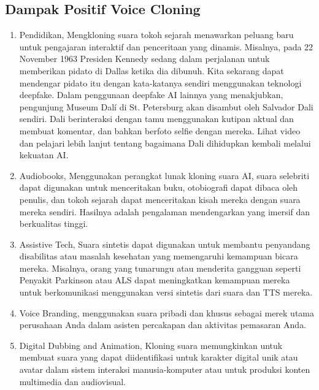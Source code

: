 \subsection{Dampak Positif Voice Cloning}
\begin{enumerate}
\item Pendidikan, Mengkloning suara tokoh sejarah menawarkan peluang baru untuk pengajaran interaktif dan penceritaan yang dinamis. Misalnya, pada 22 November 1963 Presiden Kennedy sedang dalam perjalanan untuk memberikan pidato di Dallas ketika dia dibunuh. Kita sekarang dapat mendengar pidato itu dengan kata-katanya sendiri menggunakan teknologi deepfake. Dalam penggunaan deepfake AI lainnya yang menakjubkan, pengunjung Museum Dalí di St. Petersburg akan disambut oleh Salvador Dali sendiri. Dali berinteraksi dengan tamu menggunakan kutipan aktual dan membuat komentar, dan bahkan berfoto selfie dengan mereka. Lihat video dan pelajari lebih lanjut tentang bagaimana Dali dihidupkan kembali melalui kekuatan AI. 

\item Audiobooks, Menggunakan perangkat lunak kloning suara AI, suara selebriti dapat digunakan untuk menceritakan buku, otobiografi dapat dibaca oleh penulis, dan tokoh sejarah dapat menceritakan kisah mereka dengan suara mereka sendiri. Hasilnya adalah pengalaman mendengarkan yang imersif dan berkualitas tinggi.

\item Assistive Tech, Suara sintetis dapat digunakan untuk membantu penyandang disabilitas atau masalah kesehatan yang memengaruhi kemampuan bicara mereka. Misalnya, orang yang tunarungu atau menderita gangguan seperti Penyakit Parkinson atau ALS dapat meningkatkan kemampuan mereka untuk berkomunikasi menggunakan versi sintetis dari suara dan TTS mereka.

\item Voice Branding, menggunakan suara pribadi dan khusus  sebagai merek utama perusahaan Anda dalam asisten percakapan dan aktivitas pemasaran Anda.

\item Digital Dubbing and Animation, Kloning suara memungkinkan untuk membuat suara yang dapat diidentifikasi untuk karakter digital unik atau avatar dalam sistem interaksi manusia-komputer atau untuk produksi konten multimedia dan audiovisual.


\end{enumerate}
